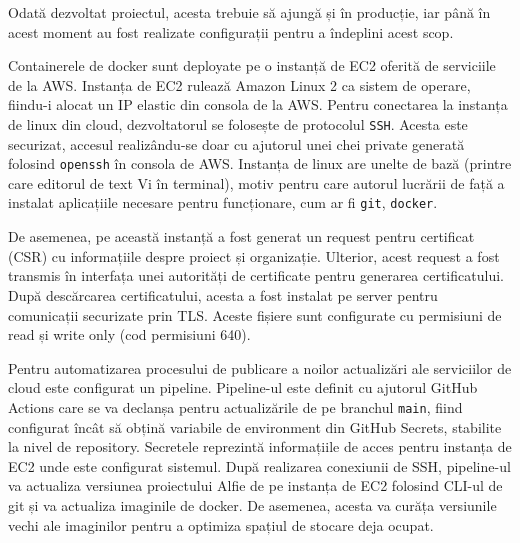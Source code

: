 Odată dezvoltat proiectul, acesta trebuie să ajungă și în producție, iar până în acest moment au fost realizate configurații pentru a îndeplini acest scop.

Containerele de docker sunt deployate pe o instanță de EC2 oferită de serviciile de la AWS. Instanța de EC2 rulează Amazon Linux 2 ca sistem de operare, fiindu-i alocat un IP elastic din consola de la AWS. Pentru conectarea la instanța de linux din cloud, dezvoltatorul se folosește de protocolul \texttt{SSH}. Acesta este securizat, accesul realizându-se doar cu ajutorul unei chei private generată folosind \texttt{openssh} în consola de AWS. Instanța de linux are unelte de bază (printre care editorul de text Vi în terminal), motiv pentru care autorul lucrării de față a instalat aplicațiile necesare pentru funcționare, cum ar fi \texttt{git}, \texttt{docker}.

De asemenea, pe această instanță a fost generat un request pentru certificat (CSR) cu informațiile despre proiect și organizație. Ulterior, acest request a fost transmis în interfața unei autorități de certificate pentru generarea certificatului. După descărcarea certificatului, acesta a fost instalat pe server pentru comunicații securizate prin TLS. Aceste fișiere sunt configurate cu permisiuni de read și write only (cod permisiuni 640).

Pentru automatizarea procesului de publicare a noilor actualizări ale serviciilor de cloud este configurat un pipeline. Pipeline-ul este definit cu ajutorul GitHub Actions care se va declanșa pentru actualizările de pe branchul \texttt{main}, fiind configurat încât să obțină variabile de environment din GitHub Secrets, stabilite la nivel de repository. Secretele reprezintă informațiile de acces pentru instanța de EC2 unde este configurat sistemul. După realizarea conexiunii de SSH, pipeline-ul va actualiza versiunea proiectului Alfie de pe instanța de EC2 folosind CLI-ul de git și va actualiza imaginile de docker. De asemenea, acesta va curăța versiunile vechi ale imaginilor pentru a optimiza spațiul de stocare deja ocupat.
